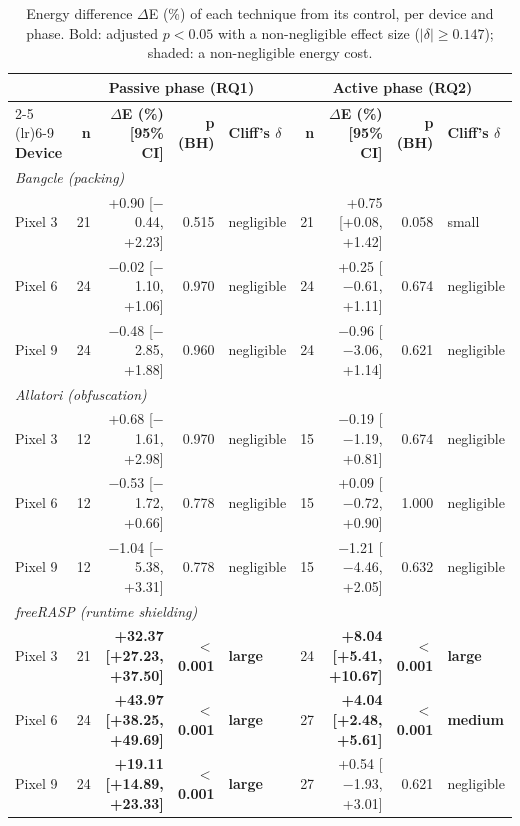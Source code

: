 \begin{table}[t]
\centering
\small
\caption{Energy difference $\Delta$E (\%) of each technique from its control, per device and phase. Bold: adjusted $p < 0.05$ with a non-negligible effect size ($|\delta| \geq 0.147$); shaded: a non-negligible energy cost.}
\label{tab:rq12}
\begin{tabular}{lrrrlrrrl}
\toprule
 & \multicolumn{4}{c}{\textbf{Passive phase (RQ1)}} & \multicolumn{4}{c}{\textbf{Active phase (RQ2)}} \\
\cmidrule(lr){2-5} \cmidrule(lr){6-9}
\textbf{Device} & \textbf{n} & \textbf{$\Delta$E (\%) [95\% CI]} & \textbf{p (BH)} & \textbf{Cliff's $\delta$} & \textbf{n} & \textbf{$\Delta$E (\%) [95\% CI]} & \textbf{p (BH)} & \textbf{Cliff's $\delta$} \\
\midrule
\multicolumn{9}{l}{\textit{Bangcle (packing)}} \\
Pixel 3 & 21 & +0.90 [$-$0.44, +2.23] & 0.515 & negligible & 21 & +0.75 [+0.08, +1.42] & 0.058 & small \\
Pixel 6 & 24 & $-$0.02 [$-$1.10, +1.06] & 0.970 & negligible & 24 & +0.25 [$-$0.61, +1.11] & 0.674 & negligible \\
Pixel 9 & 24 & $-$0.48 [$-$2.85, +1.88] & 0.960 & negligible & 24 & $-$0.96 [$-$3.06, +1.14] & 0.621 & negligible \\
\midrule
\multicolumn{9}{l}{\textit{Allatori (obfuscation)}} \\
Pixel 3 & 12 & +0.68 [$-$1.61, +2.98] & 0.970 & negligible & 15 & $-$0.19 [$-$1.19, +0.81] & 0.674 & negligible \\
Pixel 6 & 12 & $-$0.53 [$-$1.72, +0.66] & 0.778 & negligible & 15 & +0.09 [$-$0.72, +0.90] & 1.000 & negligible \\
Pixel 9 & 12 & $-$1.04 [$-$5.38, +3.31] & 0.778 & negligible & 15 & $-$1.21 [$-$4.46, +2.05] & 0.632 & negligible \\
\midrule
\multicolumn{9}{l}{\textit{freeRASP (runtime shielding)}} \\
Pixel 3 & 21 & \cellcolor{red!12}\textbf{+32.37 [+27.23, +37.50]} & \textbf{$<$ 0.001} & \textbf{large} & 24 & \cellcolor{red!12}\textbf{+8.04 [+5.41, +10.67]} & \textbf{$<$ 0.001} & \textbf{large} \\
Pixel 6 & 24 & \cellcolor{red!12}\textbf{+43.97 [+38.25, +49.69]} & \textbf{$<$ 0.001} & \textbf{large} & 27 & \cellcolor{red!12}\textbf{+4.04 [+2.48, +5.61]} & \textbf{$<$ 0.001} & \textbf{medium} \\
Pixel 9 & 24 & \cellcolor{red!12}\textbf{+19.11 [+14.89, +23.33]} & \textbf{$<$ 0.001} & \textbf{large} & 27 & +0.54 [$-$1.93, +3.01] & 0.621 & negligible \\
\bottomrule
\end{tabular}
\end{table}
